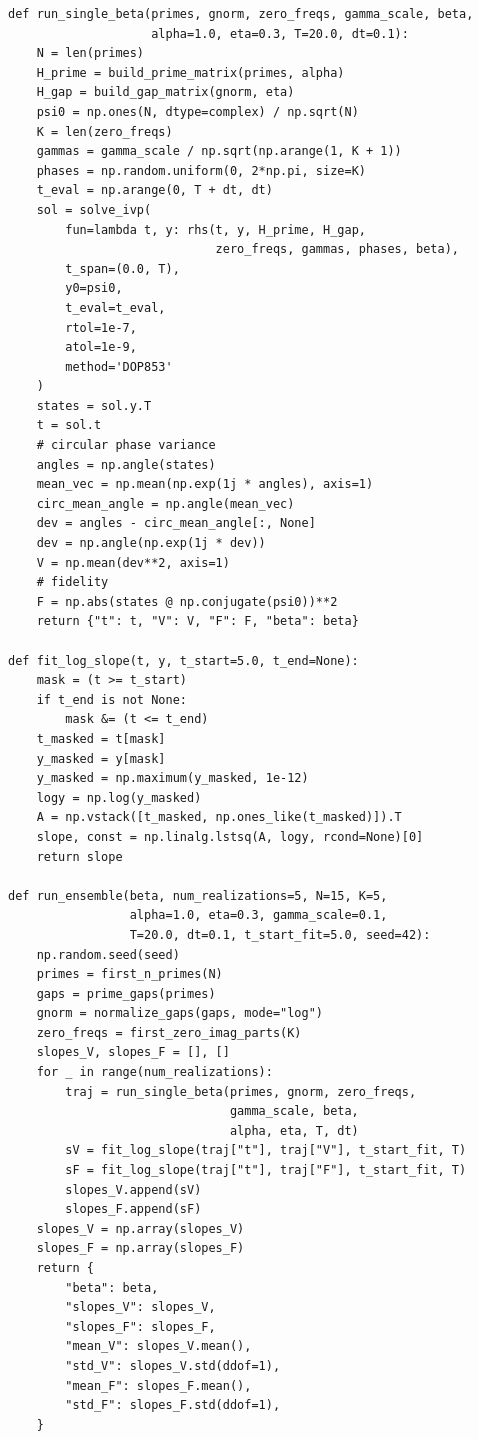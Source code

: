 \documentclass[11pt]{article}
\begin{document}
\begin{verbatim}
def run_single_beta(primes, gnorm, zero_freqs, gamma_scale, beta,
                    alpha=1.0, eta=0.3, T=20.0, dt=0.1):
    N = len(primes)
    H_prime = build_prime_matrix(primes, alpha)
    H_gap = build_gap_matrix(gnorm, eta)
    psi0 = np.ones(N, dtype=complex) / np.sqrt(N)
    K = len(zero_freqs)
    gammas = gamma_scale / np.sqrt(np.arange(1, K + 1))
    phases = np.random.uniform(0, 2*np.pi, size=K)
    t_eval = np.arange(0, T + dt, dt)
    sol = solve_ivp(
        fun=lambda t, y: rhs(t, y, H_prime, H_gap,
                             zero_freqs, gammas, phases, beta),
        t_span=(0.0, T),
        y0=psi0,
        t_eval=t_eval,
        rtol=1e-7,
        atol=1e-9,
        method='DOP853'
    )
    states = sol.y.T
    t = sol.t
    # circular phase variance
    angles = np.angle(states)
    mean_vec = np.mean(np.exp(1j * angles), axis=1)
    circ_mean_angle = np.angle(mean_vec)
    dev = angles - circ_mean_angle[:, None]
    dev = np.angle(np.exp(1j * dev))
    V = np.mean(dev**2, axis=1)
    # fidelity
    F = np.abs(states @ np.conjugate(psi0))**2
    return {"t": t, "V": V, "F": F, "beta": beta}

def fit_log_slope(t, y, t_start=5.0, t_end=None):
    mask = (t >= t_start)
    if t_end is not None:
        mask &= (t <= t_end)
    t_masked = t[mask]
    y_masked = y[mask]
    y_masked = np.maximum(y_masked, 1e-12)
    logy = np.log(y_masked)
    A = np.vstack([t_masked, np.ones_like(t_masked)]).T
    slope, const = np.linalg.lstsq(A, logy, rcond=None)[0]
    return slope

def run_ensemble(beta, num_realizations=5, N=15, K=5,
                 alpha=1.0, eta=0.3, gamma_scale=0.1,
                 T=20.0, dt=0.1, t_start_fit=5.0, seed=42):
    np.random.seed(seed)
    primes = first_n_primes(N)
    gaps = prime_gaps(primes)
    gnorm = normalize_gaps(gaps, mode="log")
    zero_freqs = first_zero_imag_parts(K)
    slopes_V, slopes_F = [], []
    for _ in range(num_realizations):
        traj = run_single_beta(primes, gnorm, zero_freqs,
                               gamma_scale, beta,
                               alpha, eta, T, dt)
        sV = fit_log_slope(traj["t"], traj["V"], t_start_fit, T)
        sF = fit_log_slope(traj["t"], traj["F"], t_start_fit, T)
        slopes_V.append(sV)
        slopes_F.append(sF)
    slopes_V = np.array(slopes_V)
    slopes_F = np.array(slopes_F)
    return {
        "beta": beta,
        "slopes_V": slopes_V,
        "slopes_F": slopes_F,
        "mean_V": slopes_V.mean(),
        "std_V": slopes_V.std(ddof=1),
        "mean_F": slopes_F.mean(),
        "std_F": slopes_F.std(ddof=1),
    }


\end{verbatim}
\end{document}
